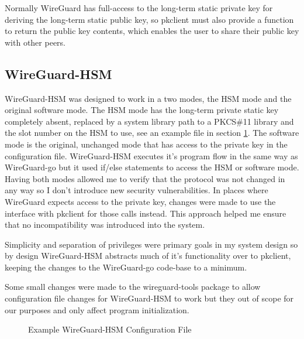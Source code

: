 \documentclass [11pt, proquest] {uwthesis}[2020/02/24]
\begin{document}
Normally WireGuard has full-access to the long-term static private key for deriving the long-term static public key, so pkclient must also provide a function to return the public key contents, which enables the user to share their public key with other peers.


\subsection{WireGuard-HSM}
WireGuard-HSM was designed to work in a two modes, the HSM mode and the original software mode. The HSM mode has the long-term private static key completely absent, replaced by a system library path to a PKCS\#11 library and the slot number on the HSM to use, see an example file in section \ref{fig:wg_hsm_config}. The software mode is the original, unchanged mode that has access to the private key in the configuration file. WireGuard-HSM executes it's program flow in the same way as WireGuard-go but it used if/else statements to access the HSM or software mode. Having both modes allowed me to verify that the protocol was not changed in any way so I don't introduce new security vulnerabilities. In places where WireGuard expects access to the private key, changes were made to use the interface with pkclient for those calls instead. This approach helped me ensure that no incompatibility was introduced into the system. 

Simplicity and separation of privileges were primary goals in my system design so by design WireGuard-HSM abstracts much of it's functionality over to pkclient, keeping the changes to the WireGuard-go code-base to a minimum. 

Some small changes were made to the wireguard-tools package to allow configuration file changes for WireGuard-HSM to work but they out of scope for our purposes and only affect program initialization.

\begin{figure}[ht]
\caption{Example WireGuard-HSM Configuration File}
\label{fig:wg_hsm_config}
\end{figure}
\end{document}
